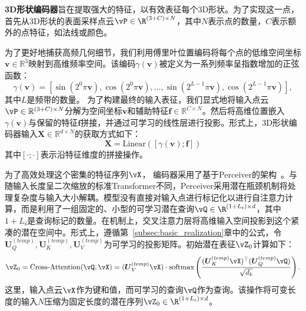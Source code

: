 \documentclass[../../book-main_zh.tex]{subfiles}
\begin{document}
\textbf{3D形状编码器}旨在提取强大的特征，以有效表征每个3D形状。为了实现这一点，首先从3D形状的表面采样点云$\vP \in \R^{(3 + C) \times N}$，其中$N$表示点的数量，$C$表示额外的点特征，如法线或颜色。

为了更好地捕获高频几何细节，我们利用傅里叶位置编码将每个点的低维空间坐标$\boldsymbol{v} \in \mathbb{R}^3$映射到高维频率空间。该编码$\gamma(\boldsymbol{v})$被定义为一系列频率呈指数增加的正弦函数：$$\gamma(\boldsymbol{v}) = [\sin(2^0\pi \boldsymbol{v}), \cos(2^0\pi \boldsymbol{v}), \dots, \sin(2^{L-1}\pi \boldsymbol{v}), \cos(2^{L-1}\pi \boldsymbol{v})],$$
其中$L$是频带的数量。
为了构建最终的输入表征，我们显式地将输入点云$\vP \in \mathbb{R}^{(3+C)
\times N}$分解为空间坐标$\boldsymbol{v}$和辅助特征$\boldsymbol{f} \in \mathbb{R}^{C \times
N}$。然后将高维位置嵌入$\gamma(\boldsymbol{v})$与保留的特征$\boldsymbol{f}$拼接，并通过可学习的线性层进行投影。形式上，3D形状编码器输入$\boldsymbol{X} \in \mathbb{R}^{d \times N}$的获取方式如下：$$\boldsymbol{X} = \text{Linear}([\gamma(\boldsymbol{v}); \boldsymbol{f}])$$其中$[\cdot ; \cdot]$表示沿特征维度的拼接操作。



为了高效处理这个密集的特征序列$\vX$，
编码器采用了基于Perceiver的架构~\cite{pmlr-v139-jaegle21a}。与随输入长度呈二次缩放的标准Transformer不同，Perceiver采用潜在瓶颈机制将处理复杂度与输入大小解耦。模型没有直接对输入点进行标记化以进行自注意力计算，而是利用了一组固定的、小型的可学习潜在查询$\vQ \in \R^{(1+L_{\mathrm{s}}) \times
d}$，其中$1 + L_{\mathrm{s}}$是查询标记的数量。在机制上，交叉注意力层将高维输入空间投影到这个紧凑的潜在空间中。形式上，遵循第~\ref{subsec:basic_realization}章中的公式，令$\boldsymbol{U}^{(temp)}_{Q}, \boldsymbol{U}^{(temp)}_{K}, \boldsymbol{U}^{(temp)}_{V}$为可学习的投影矩阵。初始潜在表征$\vZ_0$计算如下：
$$\vZ_0 = \text{Cross-Attention}
(\vQ, \vX) = (\boldsymbol{U}^{(temp)}_{V}\vX) \cdot \text{softmax}\left(\frac{(\boldsymbol{U}^{(temp)}_{K}\vX)^\top(\boldsymbol{U}^{(temp)}_{Q}\vQ)}
{\sqrt{d_k}}\right).$$
这里，输入点云$\vX$作为键和值，而可学习的查询$\vQ$作为查询。该操作将可变长度的输入$N$压缩为固定长度的潜在序列$\vZ_0 \in \R^{(1+L_{\mathrm{s}}) \times
d}$。
\end{document}

